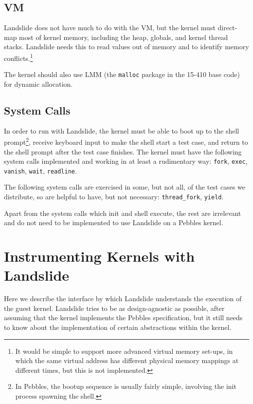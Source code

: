 \subsection{VM}

Landslide does not have much to do with the VM, but the kernel must direct-map most of kernel memory, including the heap, globals, and kernel thread stacks. Landslide needs this to read values out of memory and to identify memory conflicts.\footnote{
It would be simple to support more advanced virtual memory set-ups, in which the same virtual address has different physical memory mappings at different times, but this is not implemented.}

The kernel should also use LMM (the \texttt{malloc} package in the 15-410 base code) for dynamic allocation.

\subsection{System Calls}

In order to run with Landslide, the kernel must be able to boot up to the shell prompt\footnote{
In Pebbles, the bootup sequence is usually fairly simple, involving the init process spawning the shell.},
receive keyboard input to make the shell start a test case, and return to the shell prompt after the test case finishes. The kernel must have the following system calls implemented and working in at least a rudimentary way:
\texttt{fork}, \texttt{exec}, \texttt{vanish}, \texttt{wait}, \texttt{readline}.

The following system calls are exercised in some, but not all, of the test cases we distribute, so are helpful to have, but not necessary:
\texttt{thread\_fork}, \texttt{yield}.

Apart from the system calls which init and shell execute, the rest are irrelevant and do not need to be implemented to use Landslide on a Pebbles kernel.

\section{Instrumenting Kernels with Landslide}
\label{sec:using-instrumenting}

Here we describe the interface by which Landslide understands the execution of the guest kernel. Landslide tries to be as design-agnostic as possible, after assuming that the kernel implements the Pebbles specification, but it still needs to know about the implementation of certain abstractions within the kernel.

